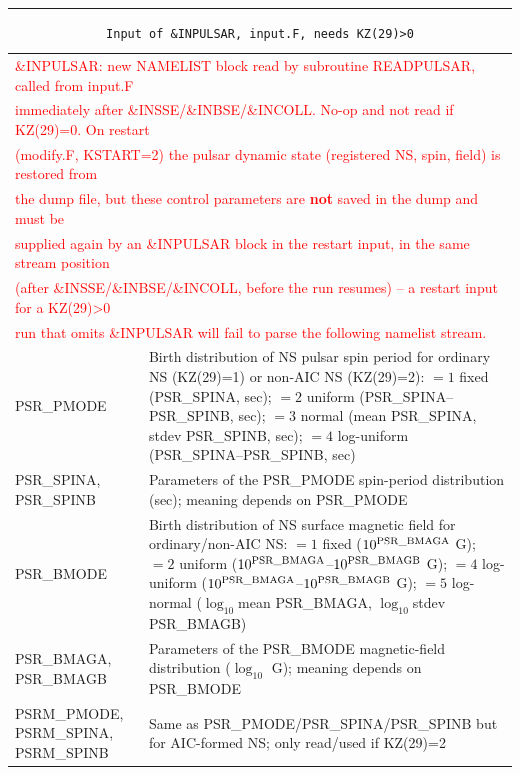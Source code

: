 \hrule
\noindent
\begin{longtable}{@{}p{2.3cm}p{12.2cm}}
\caption{\texttt{Input of \&INPULSAR, input.F, needs KZ(29)>0}}
\label{table:inpulsar}\\\hline
%
\multicolumn{2}{l}{\textcolor{red}{\&INPULSAR: new NAMELIST block read by subroutine READPULSAR, called from input.F}} \\
\multicolumn{2}{l}{\textcolor{red}{immediately after \&INSSE/\&INBSE/\&INCOLL. No-op and not read if KZ(29)=0. On restart}} \\
\multicolumn{2}{l}{\textcolor{red}{(modify.F, KSTART=2) the pulsar dynamic state (registered NS, spin, field) is restored from}} \\
\multicolumn{2}{l}{\textcolor{red}{the dump file, but these control parameters are {\bf not} saved in the dump and must be}} \\
\multicolumn{2}{l}{\textcolor{red}{supplied again by an \&INPULSAR block in the restart input, in the same stream position}} \\
\multicolumn{2}{l}{\textcolor{red}{(after \&INSSE/\&INBSE/\&INCOLL, before the run resumes) -- a restart input for a KZ(29)>0}} \\
\multicolumn{2}{l}{\textcolor{red}{run that omits \&INPULSAR will fail to parse the following namelist stream.}} \\\hline
PSR\_PMODE & Birth distribution of NS pulsar spin period for ordinary NS (KZ(29)=1) or non-AIC NS (KZ(29)=2): $=1$ fixed (PSR\_SPINA, sec); $=2$ uniform (PSR\_SPINA--PSR\_SPINB, sec); $=3$ normal (mean PSR\_SPINA, stdev PSR\_SPINB, sec); $=4$ log-uniform (PSR\_SPINA--PSR\_SPINB, sec) \\
PSR\_SPINA, PSR\_SPINB & Parameters of the PSR\_PMODE spin-period distribution (sec); meaning depends on PSR\_PMODE \\
PSR\_BMODE & Birth distribution of NS surface magnetic field for ordinary/non-AIC NS: $=1$ fixed ($10^{\rm PSR\_BMAGA}$ G); $=2$ uniform ($10^{\rm PSR\_BMAGA}$--$10^{\rm PSR\_BMAGB}$ G); $=4$ log-uniform ($10^{\rm PSR\_BMAGA}$--$10^{\rm PSR\_BMAGB}$ G); $=5$ log-normal ($\log_{10}$mean PSR\_BMAGA, $\log_{10}$stdev PSR\_BMAGB) \\
PSR\_BMAGA, PSR\_BMAGB & Parameters of the PSR\_BMODE magnetic-field distribution ($\log_{10}$ G); meaning depends on PSR\_BMODE \\
PSRM\_PMODE, PSRM\_SPINA, PSRM\_SPINB & Same as PSR\_PMODE/PSR\_SPINA/PSR\_SPINB but for AIC-formed NS; only read/used if KZ(29)=2 \\

\end{longtable}
